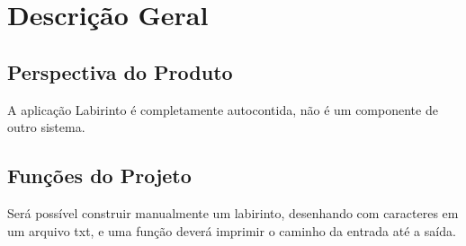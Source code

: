 \chapter{Descrição Geral}

\section{Perspectiva do Produto}
A aplicação Labirinto é completamente autocontida, não é um componente de outro sistema.

\section{Funções do Projeto}
Será possível construir manualmente um labirinto, desenhando com caracteres em um arquivo txt, e uma função deverá imprimir o caminho da entrada até a saída.


